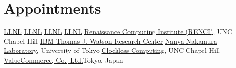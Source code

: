 \section{Appointments}
		{\href{http://www.llnl.gov}{LLNL}}{}{}
		{\href{http://www.llnl.gov}{LLNL}}{}{}
		{\href{http://www.llnl.gov}{LLNL}}{}{}
		{\href{http://www.llnl.gov}{LLNL}}{}{}
		{\href{http://www.renci.org}{Renaissance Computing Institute (RENCI)}, UNC Chapel Hill}{}{}{}
		{\href{http://www.watson.ibm.com}{IBM Thomas J. Watson Research Center}}{}{}{}
		{\href{http://www.hal.rcast.u-tokyo.ac.jp/}{Nanya-Nakamura Laboratory}, University of Tokyo}{}{}{}
		{\href{http://www.cs.unc.edu/~montek/}{Clockless Computing}, UNC Chapel Hill}{}{}{}
		{\href{http://valuecommerce.com}{ValueCommerce, Co., Ltd.}}{Tokyo, Japan}{}{}
